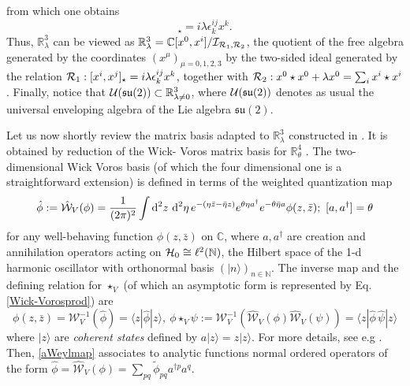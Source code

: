 \documentclass[a4paper,11pt]{article}
\numberwithin{equation}{section}
\newcommand\Rl{\mathbb{R}^3_\lambda}
\newcommand\dd{{\text{\textup{d}}}}
\theoremstyle{nonumberplain}
\begin{document}
from which one obtains
\begin{equation}
 [x^i,x^j]_\star=i \lambda \epsilon^{ij}_k  x^k \label{acommsu2}.
\end{equation}
Thus,  $\mathbb{R}^3_\lambda$ can be viewed as $\mathbb{R}^3_\lambda=\mathbb{C}[x^0,x^i]/{\cal{I}}_{{\cal{R}}_1,{\cal{R}}_2 }$, the quotient of the free algebra generated by the coordinates $(x^\mu)_{\mu=0,1,2,3}$ by the two-sided ideal generated by the relation ${\cal{R}}_1: [x^i,x^j]_\star=i\lambda\epsilon^{ij}_k x^k$, together with ${\cal{R}}_2: x^0\star x^0 +\lambda x^0 = \sum_i x^i\star x^i$. Finally, notice that ${\cal{U}}(\mathfrak{su}(2))\subset\mathbb{R}^3_{\lambda\ne 0}$, where ${\cal{U}}(\mathfrak{su}(2))$ denotes as usual the universal enveloping algebra of the Lie algebra $\mathfrak{su}(2)$.\par 

Let us now shortly review  the matrix basis adapted to $\Rl$ constructed in \cite{vit-wal-12, duflo}. It is obtained by reduction of the Wick- Voros matrix basis for $\mathbb{R}^4_\theta$ \cite{discofuzzy}. The two-dimensional Wick Voros basis (of which the four dimensional one is a straightforward  extension)  is defined in terms of the  weighted quantization map
\begin{equation}
\hat \phi:=\hat {\mathcal{W}}_V(\phi)=\frac{1}{(2\pi)^2}\int\dd^2 z\  \dd^2 \eta\, e^{{ -( \eta \bar z-\bar\eta z )}} e^{\theta\eta a^\dag} e^{-\theta\bar\eta a }
\phi(z, \bar z);\    [a, a^\dag]=\theta\label{aWeylmap}
\end{equation}
for any well-behaving function $\phi(z,\bar{z})$ on $\mathbb{C}$, where $a, a^\dag$ are creation
and annihilation operators acting on ${\cal{H}}_0\cong \ell^2(\mathbb{N})$, the Hilbert space of the 1-d harmonic oscillator with orthonormal basis $(|n\rangle)_{n\in\mathbb{N}}$. The inverse map and the defining relation for $\star_V$  (of which an asymptotic form is represented by Eq. \eqref{Wick-Vorosprod}) are
\begin{equation}
\phi(z,\bar z) = \mathcal{W}_V^{-1}(\hat \phi)= \langle z|\hat \phi|z\rangle,\ \phi\star_V \psi := \mathcal{W}_V^{-1}\left(\hat{\mathcal{W}}_V(\phi)\hat {\mathcal{W}}_V(\psi)\right)= \langle z|\hat \phi\,\hat \psi|z\rangle
\label{Wick-Voros}
\end{equation}
where $|z\rangle$ are {\it coherent states} defined by $a|z\rangle=z|z\rangle$. For more details, see e.g \cite{discofuzzy}. Then, \eqref{aWeylmap} associates to  analytic functions  normal ordered operators of the form $\hat \phi =\hat {\mathcal{W}}_V(\phi)=\sum_ {pq}\tilde\phi_{pq}  a^{\dag p} a^q $. 
\end{document}
